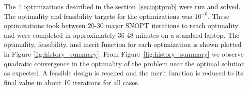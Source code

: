 \documentclass[conf]{new-aiaa}
\begin{document}

The 4 optimizations described in the section~\ref{sec:optprob} were run and solved.
The optimality and feasibility targets for the optimizations was $10^{-6}$.
These optimizations took between 20-30 major SNOPT iterations to reach optimality and were completed in approximately 36-48 minutes on a standard laptop.
The optimality, feasibility, and merit function for each optimization is shown plotted in Figure \ref{fig:history_summary}.
From Figure~\ref{fig:history_summary} we observe quadratic convergence in the optimality of the problem near the optimal solution as expected.
A feasible design is reached and the merit function is reduced to its final value in about 10 iterations for all cases.
\end{document}
